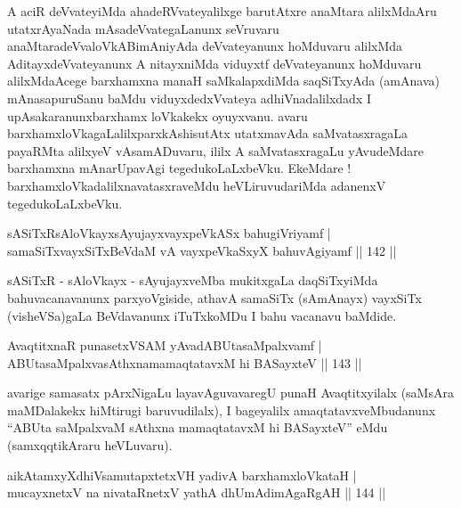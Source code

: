 \begin{artha}
A aciR deVvateyiMda ahadeRVvateyalilxge barutAtxre anaMtara alilxMdaAru utatxrAyaNada mAsadeVvategaLanunx seVruvaru anaMtaradeVvaloVkABimAni\-yAda deVvateyanunx hoMduvaru alilxMda AditayxdeVvateyanunx A nitayxniMda viduyxtf deVvateyanunx hoMduvaru alilxMdaAcege barxhamxna manaH saMkalapxdiMda saqSiTxyAda (amAnava) mAnasapuruSanu baMdu viduyxdedxVvateya adhiVnadalilxdadx I upAsakaranunxbarxhamx loVkakekx oyuyxvanu. avaru barxhamxloVkagaLalilxparxkAshisutAtx utatxmavAda saMvatasxragaLa payaRMta alilxyeV vAsamADuvaru, ililx A saMvatasxragaLu yAvudeMdare  barxhamxna mAnarUpavAgi tegedukoLaLxbeVku. EkeMdare ! barxhamxloVkadalilxnavatasxraveMdu heVLiruvudariMda adanenxV tegedukoLaLxbeVku.
\end{artha}


\begin{shl}
sASiTxRsAloVkayxsAyujayxvayxpeVkASx bahugiVriyamf | \\
samaSiTxvayxSiTxBeVdaM vA vayxpeVkaSxyX bahuvAgiyamf \hfill|| 142 || 
\end{shl}

\begin{artha}
sASiTxR - sAloVkayx - sAyujayxveMba mukitxgaLa daqSiTxyiMda
bahuvacanavanunx parxyoVgiside, athavA samaSiTx (sAmAnayx) vayxSiTx
(visheVSa)gaLa BeVdavanunx iTuTxkoMDu I bahu vacanavu baMdide.
\end{artha}


\begin{shl}
AvaqtitxnaR punasetxVSAM yAvadABUtasaMpalxvamf | \\
ABUtasaMpalxvasAthxnamamaqtatavxM hi BASayxteV \hfill|| 143 || 
\end{shl}

\begin{artha}
avarige samasatx pArxNigaLu layavAguvavaregU punaH Avaqtitxyilalx
(saMsAra maMDalakekx hiMtirugi baruvudilalx), I bageyalilx
amaqtatavxveMbudanunx ``ABUta saMpalxvaM sAthxna mamaqtatavxM
hi BASayxteV'' eMdu (samxqqtikAraru heVLuvaru).
\end{artha}


\begin{shl}
aikAtamxyXdhiVsamutapxtetxVH yadivA barxhamxloVkataH | \\
mucayxnetxV na nivataRnetxV yathA dhUmAdimAgaRgAH \hfill|| 144 || 
\end{shl}

